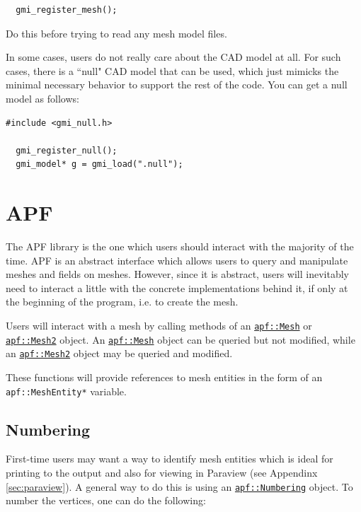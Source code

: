 \documentclass{article}
\begin{document}
\begin{lstlisting}
  gmi_register_mesh();
\end{lstlisting}

Do this before trying to read any mesh model files.

In some cases, users do not really care about the CAD model at
all.
For such cases, there is a ``null" CAD model that can be used,
which just mimicks the minimal necessary behavior to support
the rest of the code.
You can get a null model as follows:

\begin{lstlisting}
#include <gmi_null.h>

  gmi_register_null();
  gmi_model* g = gmi_load(".null");
\end{lstlisting}

\section{APF}

The APF library is the one which users should interact with the
majority of the time.
APF is an abstract interface which allows users to query and manipulate
meshes and fields on meshes.
However, since it is abstract, users will inevitably need to
interact a little with the concrete implementations behind it,
if only at the beginning of the program, i.e. to create the mesh.

Users will interact with a mesh by calling methods of an
\href{http://scorec.rpi.edu/~dibanez/core/classapf_1_1Mesh.html}{\texttt{apf::Mesh}}
or
\href{http://scorec.rpi.edu/~dibanez/core/classapf_1_1Mesh2.html}{\texttt{apf::Mesh2}}
object.
An
\href{http://scorec.rpi.edu/~dibanez/core/classapf_1_1Mesh.html}{\texttt{apf::Mesh}}
object can be queried but not modified, while an
\href{http://scorec.rpi.edu/~dibanez/core/classapf_1_1Mesh2.html}{\texttt{apf::Mesh2}}
object may be queried and modified.

These functions will provide references to mesh entities in the
form of an \texttt{apf::MeshEntity*} variable.

\subsection{Numbering}
\label{sec:num}

First-time users may want a way to identify mesh entities which
is ideal for printing to the output and also for viewing in
Paraview (see Appendinx \ref{sec:paraview}).
A general way to do this is using an
\href{http://scorec.rpi.edu/~dibanez/core/apfNumbering_8h.html}{\texttt{apf::Numbering}}
object.
To number the vertices, one can do the following:
\end{document}
